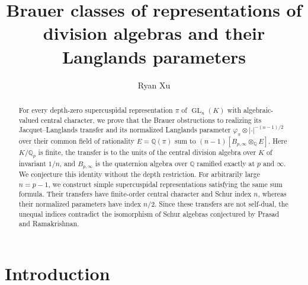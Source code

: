 \documentclass[a4paper,11pt]{amsart}
\theoremstyle{definition}
\theoremstyle{remark}
\numberwithin{equation}{section}
\newcommand{\Q}{\mathbb{Q}}
\DeclareMathOperator{\GL}{GL}
\newcommand{\Qp}{\mathbb{Q}_p}
\newcommand{\Bpinf}{B_{p,\infty}}
\begin{document}
\title[Brauer classes of transfers and Langlands parameters]{Brauer classes of representations of division algebras and their Langlands parameters}
\author{Ryan Xu}
\address{Universit\'e Paris-Saclay, Facult\'e des Sciences d'Orsay, 91400 Orsay, France}

\begin{abstract}
For every depth-zero supercuspidal representation $\pi$ of $\GL_n(K)$ with algebraic-valued central character, we prove that the Brauer obstructions to realizing its Jacquet--Langlands transfer and its normalized Langlands parameter $\varphi_\pi\otimes|\cdot|^{-(n-1)/2}$ over their common field of rationality $E=\Q(\pi)$ sum to $(n-1)[\Bpinf\otimes_\Q E]$. Here $K/\Qp$ is finite, the transfer is to the units of the central division algebra over $K$ of invariant $1/n$, and $\Bpinf$ is the quaternion algebra over $\Q$ ramified exactly at $p$ and $\infty$. We conjecture this identity without the depth restriction. For arbitrarily large $n=p-1$, we construct simple supercuspidal representations satisfying the same sum formula. Their transfers have finite-order central character and Schur index $n$, whereas their normalized parameters have index $n/2$. Since these transfers are not self-dual, the unequal indices contradict the isomorphism of Schur algebras conjectured by Prasad and Ramakrishnan.
\end{abstract}

\maketitle

\tableofcontents

\section{Introduction}\label{sec:intro}
\end{document}
